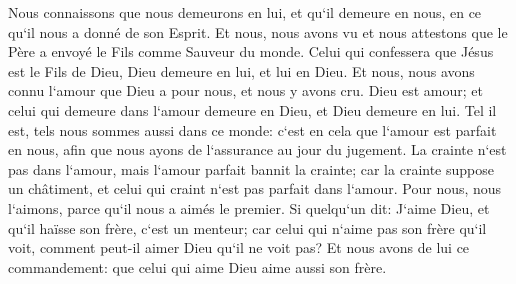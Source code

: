 \verse Nous connaissons que nous demeurons en lui, et qu`il demeure en nous, en ce qu`il nous a donné de son Esprit. 
\verse Et nous, nous avons vu et nous attestons que le Père a envoyé le Fils comme Sauveur du monde. 
\verse Celui qui confessera que Jésus est le Fils de Dieu, Dieu demeure en lui, et lui en Dieu. 
\verse Et nous, nous avons connu l`amour que Dieu a pour nous, et nous y avons cru. Dieu est amour; et celui qui demeure dans l`amour demeure en Dieu, et Dieu demeure en lui. 
\verse Tel il est, tels nous sommes aussi dans ce monde: c`est en cela que l`amour est parfait en nous, afin que nous ayons de l`assurance au jour du jugement. 
\verse La crainte n`est pas dans l`amour, mais l`amour parfait bannit la crainte; car la crainte suppose un châtiment, et celui qui craint n`est pas parfait dans l`amour. 
\verse Pour nous, nous l`aimons, parce qu`il nous a aimés le premier. 
\verse Si quelqu`un dit: J`aime Dieu, et qu`il haïsse son frère, c`est un menteur; car celui qui n`aime pas son frère qu`il voit, comment peut-il aimer Dieu qu`il ne voit pas? 
\verse Et nous avons de lui ce commandement: que celui qui aime Dieu aime aussi son frère. 

